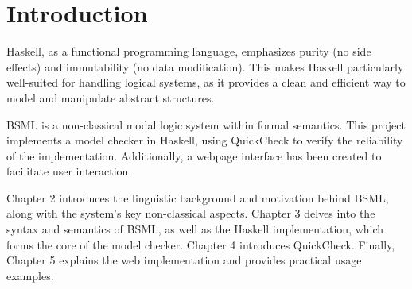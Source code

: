 
\section{Introduction}\label{sec:Introduction}

Haskell, as a functional programming language, 
emphasizes purity (no side effects) and immutability (no data modification). 
This makes Haskell particularly well-suited for handling logical systems, 
as it provides a clean and efficient way to model and manipulate abstract structures. 

BSML is a non-classical modal logic system within formal semantics. This project implements a model checker in Haskell, 
using QuickCheck to verify the reliability of the implementation. 
Additionally, a webpage interface has been created to facilitate user interaction. 

Chapter 2 introduces the linguistic background and motivation behind BSML, along with the system's key non-classical aspects. 
Chapter 3 delves into the syntax and semantics of BSML, as well as the Haskell implementation, which forms the core of the model checker. 
Chapter 4 introduces QuickCheck. 
Finally, Chapter 5 explains the web implementation and provides practical usage examples.